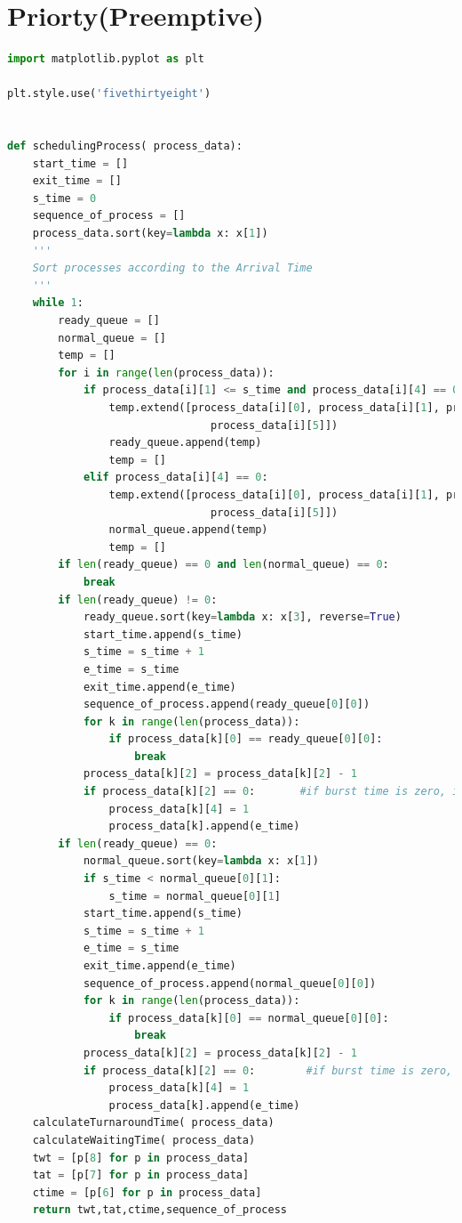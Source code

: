 \documentclass[11pt,a4paper]{report}
\begin{document}
\section{Priorty(Preemptive)}
\begin{lstlisting}[language=Python,caption=SJF Preemptive Source code,breaklines=true,postbreak=\mbox{\textcolor{red}{$\hookrightarrow$}\space},]
import matplotlib.pyplot as plt

plt.style.use('fivethirtyeight')


def schedulingProcess( process_data):
	start_time = []
	exit_time = []
	s_time = 0
	sequence_of_process = []
	process_data.sort(key=lambda x: x[1])
	'''
	Sort processes according to the Arrival Time
	'''
	while 1:
		ready_queue = []
		normal_queue = []
		temp = []
		for i in range(len(process_data)):
			if process_data[i][1] <= s_time and process_data[i][4] == 0:
				temp.extend([process_data[i][0], process_data[i][1], process_data[i][2], process_data[i][3],
								process_data[i][5]])
				ready_queue.append(temp)
				temp = []
			elif process_data[i][4] == 0:
				temp.extend([process_data[i][0], process_data[i][1], process_data[i][2], process_data[i][4],
								process_data[i][5]])
				normal_queue.append(temp)
				temp = []
		if len(ready_queue) == 0 and len(normal_queue) == 0:
			break
		if len(ready_queue) != 0:
			ready_queue.sort(key=lambda x: x[3], reverse=True)
			start_time.append(s_time)
			s_time = s_time + 1
			e_time = s_time
			exit_time.append(e_time)
			sequence_of_process.append(ready_queue[0][0])
			for k in range(len(process_data)):
				if process_data[k][0] == ready_queue[0][0]:
					break
			process_data[k][2] = process_data[k][2] - 1
			if process_data[k][2] == 0:       #if burst time is zero, it means process is completed
				process_data[k][4] = 1
				process_data[k].append(e_time)
		if len(ready_queue) == 0:
			normal_queue.sort(key=lambda x: x[1])
			if s_time < normal_queue[0][1]:
				s_time = normal_queue[0][1]
			start_time.append(s_time)
			s_time = s_time + 1
			e_time = s_time
			exit_time.append(e_time)
			sequence_of_process.append(normal_queue[0][0])
			for k in range(len(process_data)):
				if process_data[k][0] == normal_queue[0][0]:
					break
			process_data[k][2] = process_data[k][2] - 1
			if process_data[k][2] == 0:        #if burst time is zero, it means process is completed
				process_data[k][4] = 1
				process_data[k].append(e_time)
	calculateTurnaroundTime( process_data)
	calculateWaitingTime( process_data)
	twt = [p[8] for p in process_data]
	tat = [p[7] for p in process_data]
	ctime = [p[6] for p in process_data]
	return twt,tat,ctime,sequence_of_process


\end{lstlisting}
\end{document}
